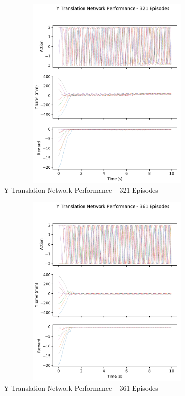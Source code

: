 \begin{figure}[H]
	\centering
	\includegraphics[width=6in, height=3.85in, keepaspectratio]{figures/train_figs/transy_transitions/2_321.pdf}
	\caption{Y Translation Network Performance -- 321 Episodes}
\end{figure}
\begin{figure}[H]
	\centering
	\includegraphics[width=6in, height=3.85in, keepaspectratio]{figures/train_figs/transy_transitions/2_361.pdf}
	\caption{Y Translation Network Performance -- 361 Episodes}
\end{figure}
